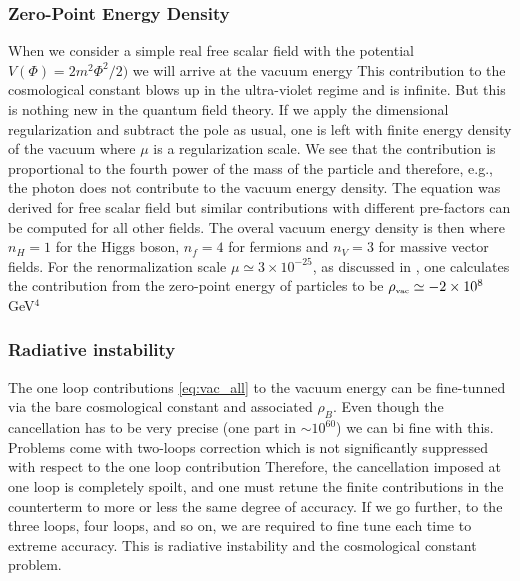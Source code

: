\subsubsection{Zero-Point Energy Density}
When we consider a simple real free scalar field with the potential $V(\Phi)=2m^2\Phi^2/2)$ we will arrive at the vacuum energy
This contribution to the cosmological constant blows up in the ultra-violet regime and is infinite. But this is nothing new in the quantum field theory. If we apply the dimensional regularization \parencite{tHooft:1972tcz} and subtract the pole as usual, one is left with finite energy density of the vacuum
where $\mu$ is a regularization scale. We see that the contribution is proportional to the fourth power of the mass of the particle and therefore, e.g., the photon does not contribute to the vacuum energy density. The equation was derived for free scalar field but similar contributions with different pre-factors can be computed for all other fields. The overal vacuum energy density is then
where $n_H=1$ for the Higgs boson, $n_f=4$ for fermions and $n_V=3$ for massive vector fields. For the renormalization scale $\mu\simeq3\times10^{-25}$, as discussed in \textcite{2011arXiv1105.6296K}, one calculates the contribution from the zero-point energy of particles to be  $\rho_\text{\tiny vac}\simeq-2\times10^8$ GeV$^4$
\subsubsection{Radiative instability}
The one loop contributions \eqref{eq:vac_all} to the vacuum energy can be fine-tunned via the bare cosmological constant and associated $\rho_B$. Even though the cancellation has to be very precise (one part in $\sim10^{60}$) we can bi fine with this. Problems come with two-loops correction which is not significantly suppressed with respect to the one loop contribution 
Therefore, the cancellation imposed at one loop is completely spoilt, and one must retune the finite contributions in the counterterm to more or less the same degree of accuracy. If we go further, to the three loops, four loops, and so on, we are required to fine tune each time to extreme accuracy. This is radiative instability and the cosmological constant problem.

